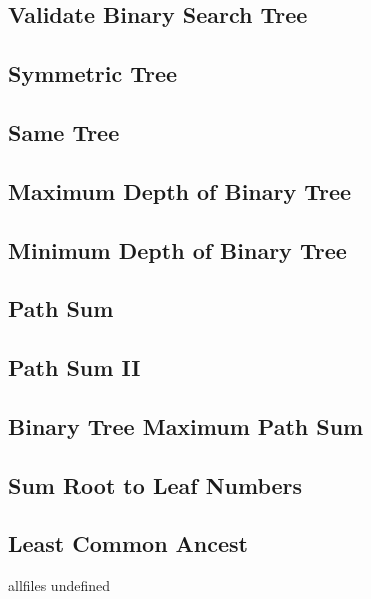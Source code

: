 \documentclass{article}
\begin{document}
\begin{CJK}{UTF8}{gbsn}     %

\else
    
\subsection{Validate Binary Search Tree}

\subsection{Symmetric Tree}

\subsection{Same Tree}

\subsection{Maximum Depth of Binary Tree}

\subsection{Minimum Depth of Binary Tree}

\subsection{Path Sum}

\subsection{Path Sum II}

\subsection{Binary Tree Maximum Path Sum}

\subsection{Sum Root to Leaf Numbers}

\subsection{Least Common Ancest}


\fi

\ifx allfiles undefined
\end{CJK}
\end{document}
